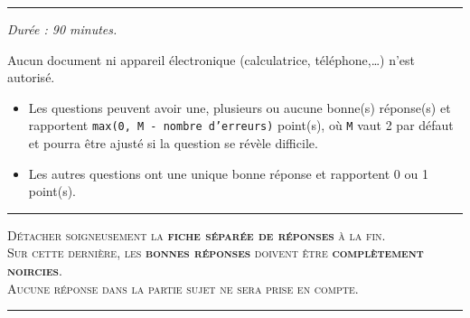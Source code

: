 \begin{center}
  \hrule \vspace{0.5em}
  \em
  Durée : 90 minutes.

  Aucun document ni appareil électronique (calculatrice,
  téléphone,\dots) n'est autorisé.

  \begin{itemize}
  \item Les questions \multiSymbole{} peuvent avoir une, plusieurs ou aucune
    bonne(s) réponse(s) et rapportent \texttt{\textsf{max}(0, M - nombre d'erreurs)}
    point(s), où \texttt{M} vaut 2 par défaut et pourra être ajusté si la
    question se révèle difficile.
  \item Les autres questions ont une unique bonne réponse et rapportent 0 ou 1 point(s).
  \end{itemize}


  \vspace{0.5em}
  \hrule \vspace{0.5em}
  \textsc{Détacher soigneusement la \textbf{fiche séparée de réponses}
    à la fin. \\
    Sur cette dernière, les \textbf{bonnes réponses} doivent être 
    \textbf{complètement noircies}. \\
    Aucune réponse dans la partie sujet ne sera prise en compte.}
  \vspace{0.5em} \hrule
\end{center}
\vspace{1ex}

